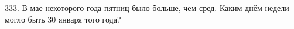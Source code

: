 333. В мае некоторого года пятниц было больше, чем сред. Каким днём недели могло быть 30 января того года?\\

